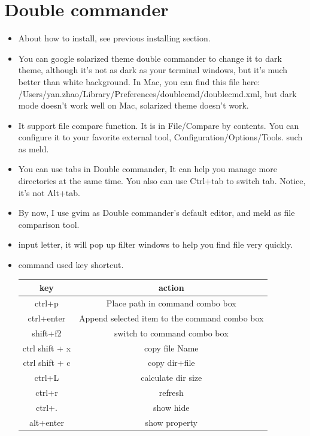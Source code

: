 \documentclass[a4paper,11pt,twoside]{book}
\begin{document}
\section{Double commander}
\begin{itemize}
	\item About how to install, see previous installing section.
	
	\item You can google solarized theme double commander to change it to dark theme, although it's not as dark as your terminal windows, but it's much better than white background.  In Mac, you can find this file here: /Users/yan.zhao/Library/Preferences/doublecmd/doublecmd.xml, but dark mode doesn't work well on Mac, solarized theme doesn't work.
	
	\item It support file compare function. It is in File/Compare by contents.  You can configure it to your favorite external tool, Configuration/Options/Tools. such as meld. 
	
	\item You can use tabs in Double commander, It can help you manage more directories at the same time. You also can use Ctrl+tab to switch tab. Notice, it's not Alt+tab. 
	
	\item By now, I use gvim as Double commander's default editor, and meld as file comparison tool. 
	
	\item input letter, it will pop up filter windows to help you find file very quickly.
	
	\item command used key shortcut.\\			
	
	\begin{tabular}{|c|c|}
		\hline 
		\textbf{key} & \textbf{action} \\ 
		\hline 
		ctrl+p & Place path in command combo box   \\ 
		\hline 
		ctrl+enter  & Append selected item to the command combo box \\ 
		\hline 
		shift+f2  & switch to command combo box \\ 
		
		\hline 
		ctrl shift + x & copy file Name \\ 
		\hline 
		ctrl shift + c & copy dir+file \\ 
		
		\hline \hline  
		ctrl+L & calculate dir size  \\ 
		\hline 
		ctrl+r & refresh  \\ 
		\hline 
		ctrl+.  & show hide  \\ 
		\hline 
		alt+enter & show property \\ 
		

\end{tabular}
\end{itemize}
\end{document}
